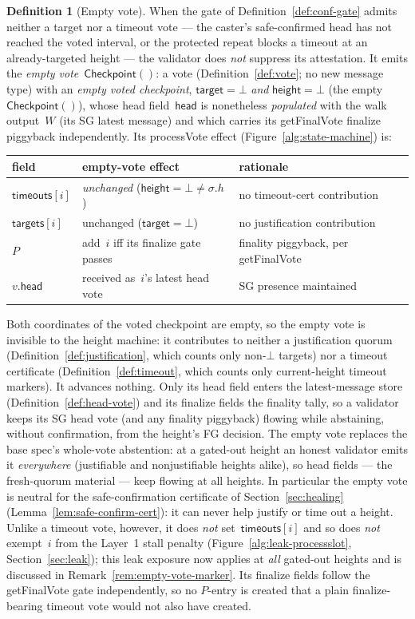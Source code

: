 \ifx\litemode\undefined\documentclass{article}\fi
\newcommand{\target}{\mathsf{target}}
\newcommand{\height}{\mathsf{height}}
\newcommand{\targets}{\mathsf{targets}}
\newcommand{\timeouts}{\mathsf{timeouts}}
\newcommand{\processVote}{\textsf{processVote}\xspace}
\newcommand{\getFinalVote}{\textsf{getFinalVote}\xspace}
\newcommand{\headf}{\mathsf{head}}          %
\newcommand{\emptyckpt}{\ensuremath{\mathsf{Checkpoint}()}} %
\theoremstyle{plain}
\theoremstyle{definition}
\newtheorem{definition}{Definition}
\theoremstyle{remark}
\begin{document}
\begin{definition}[Empty vote]\label{def:empty-target}
When the gate of Definition~\ref{def:conf-gate} admits neither a target nor a
timeout vote --- the caster's safe-confirmed head has not reached the voted
interval, or the protected repeat blocks a timeout at an already-targeted
height --- the validator does \emph{not} suppress its attestation.  It emits the
\emph{empty vote}~$\emptyckpt$: a vote (Definition~\ref{def:vote}; no new
message type) with an \emph{empty voted checkpoint}, $\target = \bot$
\emph{and} $\height = \bot$ (the empty $\mathsf{Checkpoint}()$), whose head
field~$\headf$ is nonetheless \emph{populated} with the walk output~$W$ (its SG
latest message) and which carries its \getFinalVote{} finalize piggyback
independently.  Its \processVote{} effect (Figure~\ref{alg:state-machine}) is:
\begin{center}
\begin{tabular}{@{}lll@{}}
\toprule
field & empty-vote effect & rationale \\
\midrule
$\timeouts[i]$ & \emph{unchanged} ($\height = \bot \neq \sigma.h$) & no timeout-cert contribution \\
$\targets[i]$  & unchanged ($\target = \bot$) & no justification contribution \\
$P$            & add~$i$ iff its finalize gate passes & finality piggyback, per \getFinalVote \\
$v.\headf$     & received as~$i$'s latest head vote & SG presence maintained \\
\bottomrule
\end{tabular}
\end{center}
Both coordinates of the voted checkpoint are empty, so the empty vote is
invisible to the height machine: it contributes to neither a justification
quorum (Definition~\ref{def:justification}, which counts only non-$\bot$
targets) nor a timeout certificate (Definition~\ref{def:timeout}, which
counts only current-height timeout markers).  It advances nothing.  Only its
head field enters the latest-message store (Definition~\ref{def:head-vote}) and
its finalize fields the finality tally, so a validator keeps its SG head vote
(and any finality piggyback) flowing while abstaining, without confirmation,
from the height's FG decision.
The empty vote replaces the base spec's whole-vote abstention: at a gated-out
height an honest validator emits it \emph{everywhere} (justifiable and
nonjustifiable heights alike), so head fields --- the fresh-quorum material ---
keep flowing at all heights.  In particular the empty vote is neutral for the
safe-confirmation certificate of Section~\ref{sec:healing}
(Lemma~\ref{lem:safe-confirm-cert}): it can never help justify or time out
a height.  Unlike a timeout vote, however, it does \emph{not} set~$\timeouts[i]$
and so does \emph{not} exempt~$i$ from the Layer~1 stall penalty
(Figure~\ref{alg:leak-processslot}, Section~\ref{sec:leak}); this leak exposure
now applies at \emph{all} gated-out heights and is discussed in
Remark~\ref{rem:empty-vote-marker}.  Its finalize fields follow the
\getFinalVote{} gate independently, so no $P$-entry is created that a plain
finalize-bearing timeout vote would not also have created.
\end{definition}
\end{document}
